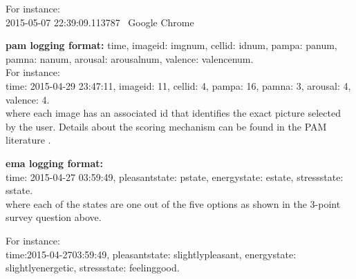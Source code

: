 \documentclass{article}
\begin{document}
For instance:\\
2015-05-07 22:39:09.113787 \textpipe  \  Google Chrome

\textbf{pam logging format:}
time, 
image\textunderscore id: img\textunderscore num, 
cell\textunderscore id: id\textunderscore num, 
pam\textunderscore pa: pa\textunderscore num, 
pam\textunderscore na: na\textunderscore num, 
arousal: arousal\textunderscore num, 
valence: valence\textunderscore num. \\

For instance: \\
time: 2015-04-29 23:47:11, image\textunderscore id: 11, cell\textunderscore id: 4, pam\textunderscore pa: 16, pam\textunderscore na: 3, arousal: 4, valence: 4. \\
where each image has an associated id that identifies the exact picture selected by the user. Details about the scoring mechanism can be found in the PAM literature \cite{pollak2011pam}.

\textbf{ema logging format:}\\
time: 2015-04-27 03:59:49, pleasant\textunderscore state: p\textunderscore state, energy\textunderscore state: e\textunderscore state, stress\textunderscore state: s\textunderscore state. \\
where each of the states are one out of the five options as shown in the 3-point survey question above. 

For instance: \\
time:2015-04-2703:59:49, pleasant\textunderscore state: slightly\textunderscore pleasant, energy\textunderscore state: slightly\textunderscore energetic, stress\textunderscore state: feeling\textunderscore good.

\end{document}
